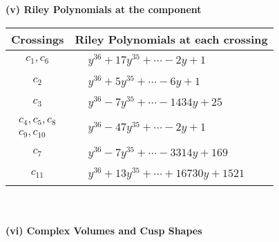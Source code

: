 \documentclass[1p]{elsarticle_modified}
\theoremstyle{definition}
\begin{document}
\newpage\renewcommand{\arraystretch}{1}
\flushleft \textbf{(v) Riley Polynomials at the component}\newline \\
\begin{tabular}{m{50pt}|m{274pt}}
Crossings & \hspace{64pt}Riley Polynomials at each crossing \\
\hline $$\begin{aligned}c_{1},c_{6}\end{aligned}$$&$\begin{aligned}
&y^{36}+17 y^{35}+\cdots-2 y+1
\end{aligned}$\\
\hline $$\begin{aligned}c_{2}\end{aligned}$$&$\begin{aligned}
&y^{36}+5 y^{35}+\cdots-6 y+1
\end{aligned}$\\
\hline $$\begin{aligned}c_{3}\end{aligned}$$&$\begin{aligned}
&y^{36}-7 y^{35}+\cdots-1434 y+25
\end{aligned}$\\
\hline $$\begin{aligned}c_{4},c_{5},c_{8}\\c_{9},c_{10}\end{aligned}$$&$\begin{aligned}
&y^{36}-47 y^{35}+\cdots-2 y+1
\end{aligned}$\\
\hline $$\begin{aligned}c_{7}\end{aligned}$$&$\begin{aligned}
&y^{36}-7 y^{35}+\cdots-3314 y+169
\end{aligned}$\\
\hline $$\begin{aligned}c_{11}\end{aligned}$$&$\begin{aligned}
&y^{36}+13 y^{35}+\cdots+16730 y+1521
\end{aligned}$\\
\hline
\end{tabular}\\~\\
\newpage\flushleft \textbf{(vi) Complex Volumes and Cusp Shapes}
\end{document}
